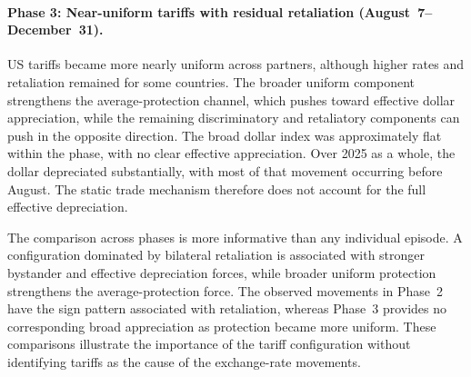 \paragraph{Phase 3: Near-uniform tariffs with residual retaliation (August~7--December~31).} US tariffs became more nearly uniform across partners, although higher rates and retaliation remained for some countries. The broader uniform component strengthens the average-protection channel, which pushes toward effective dollar appreciation, while the remaining discriminatory and retaliatory components can push in the opposite direction. The broad dollar index was approximately flat within the phase, with no clear effective appreciation. Over 2025 as a whole, the dollar depreciated substantially, with most of that movement occurring before August. The static trade mechanism therefore does not account for the full effective depreciation.

The comparison across phases is more informative than any individual episode. A configuration dominated by bilateral retaliation is associated with stronger bystander and effective depreciation forces, while broader uniform protection strengthens the average-protection force. The observed movements in Phase~2 have the sign pattern associated with retaliation, whereas Phase~3 provides no corresponding broad appreciation as protection became more uniform. These comparisons illustrate the importance of the tariff configuration without identifying tariffs as the cause of the exchange-rate movements.

\FloatBarrier
